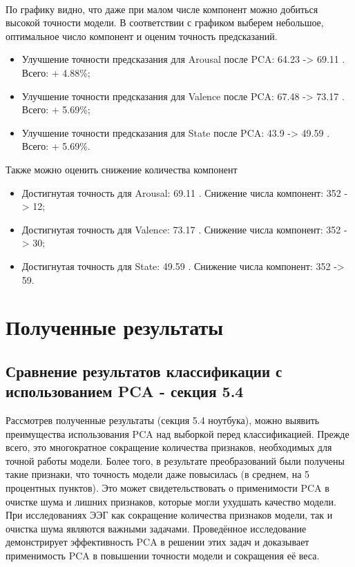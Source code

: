 \documentclass{article}
\begin{document}
    
\paragraph{}
По графику видно, что даже при малом числе компонент можно добиться высокой точности модели.
В соответствии с графиком выберем небольшое, оптимальное число компонент и оценим точность предсказаний.
\begin{itemize}
\item Улучшение точности предсказания для Arousal после PCA: 64.23 -> 69.11 . Всего: + 4.88\%;
\item Улучшение точности предсказания для Valence после PCA: 67.48 -> 73.17 . Всего: + 5.69\%;
\item Улучшение точности предсказания для State после PCA: 43.9 -> 49.59 . Всего: + 5.69\%.
\end{itemize}

Также можно оценить снижение количества компонент

\begin{itemize}
\item Достигнутая точность для Arousal: 69.11 . Снижение числа компонент:  352  ->  12;
\item Достигнутая точность для  Valence: 73.17 . Снижение числа компонент:  352  ->  30;
\item Достигнутая точность для State: 49.59 . Снижение числа компонент:  352  ->  59.
\end{itemize}

\section{Полученные результаты}
\subsection{Сравнение результатов классификации с использованием PCA - секция 5.4}
Рассмотрев полученные результаты (секция 5.4 ноутбука), можно выявить преимущества использования PCA над выборкой перед классификацией. Прежде всего, это многократное сокращение количества признаков, необходимых для точной работы модели. Более того, в результате преобразований были получены такие признаки, что точность модели даже повысилась (в среднем, на 5 процентных пунктов). Это может свидетельствовать о применимости PCA в очистке шума и лишних признаков, которые могли ухудшать качество модели.
При исследованиях ЭЭГ как сокращение количества признаков модели, так и очистка шума являются важными задачами. Проведённое исследование демонстрирует эффективность PCA в решении этих задач и доказывает применимость PCA в повышении точности модели и сокращения её веса.
\end{document}
